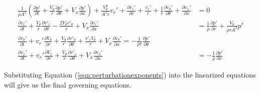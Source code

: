 \begin{align*}
\frac{1}{\bar{\rho} A^2}\left(
\frac{\partial p'}{\partial t} +
\frac{V_{\theta}}{r}
\frac{\partial p'}{\partial \theta} + 
V_x
\frac{\partial p'}{\partial x}
\right) +
\frac{V_{\theta}^2}{A^2 r}v_r'+
\frac{\partial v_r'}{\partial r} + \frac{v_r'}{r} +
\frac{1}{r}
\frac{\partial v_{\theta}'}{\partial \theta}		 
 +
\frac{\partial v_x'}{\partial x}
&= 0\\
\frac{\partial  v_r' }{\partial t} +
\frac{V_{\theta}}{r} \frac{\partial v'_r}{\partial \theta} -
\frac{2V_{\theta}v'_{\theta}}{r} +
V_x \frac{\partial v_r'}{\partial x} &= \frac{1}{\bar{\rho}} \frac{\partial p'}{\partial r}+\frac{V_{\theta}}{\bar{\rho} r A^2}   p'
\\
\frac{\partial  v_{\theta}' }{\partial t} +
v_r' \frac{\partial  V_{\theta}  }{\partial r} +
\frac{V_{\theta}}{r} \frac{\partial v'_{\theta}}{\partial \theta} +
\frac{v'_rV_{\theta}}{r} +
V_x \frac{\partial v_{\theta}'}{\partial x} 
= -\frac{1}{\bar{\rho} r}	\frac{\partial p'}{\partial \theta}\\
\frac{\partial  v_x' }{\partial t} +
v_r' \frac{\partial  V_x  }{\partial r} +
\frac{V_{\theta}}{r} \frac{\partial v'_x}{\partial \theta} +
V_x \frac{\partial v_x'}{\partial x} 
&= -\frac{1    }{\bar{\rho}}  \frac{\partial p'}{\partial x} 	
\end{align*}

%
%

Substituting Equation (\ref{eqn:perturbationexponents})  into the linearized equations will give us the final 
governing equations. 

